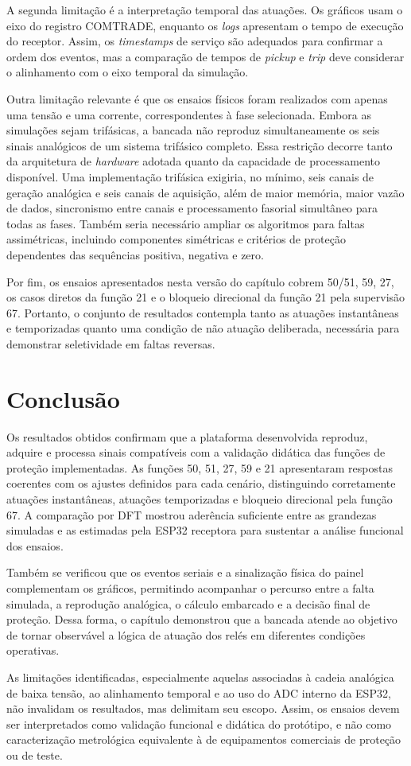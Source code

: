 A segunda limitação é a interpretação temporal das atuações. Os gráficos usam o eixo do registro COMTRADE, enquanto os \textit{logs} apresentam o tempo de execução do receptor. Assim, os \textit{timestamps} de serviço são adequados para confirmar a ordem dos eventos, mas a comparação de tempos de \textit{pickup} e \textit{trip} deve considerar o alinhamento com o eixo temporal da simulação.

Outra limitação relevante é que os ensaios físicos foram realizados com apenas uma tensão e uma corrente, correspondentes à fase selecionada. Embora as simulações sejam trifásicas, a bancada não reproduz simultaneamente os seis sinais analógicos de um sistema trifásico completo. Essa restrição decorre tanto da arquitetura de \textit{hardware} adotada quanto da capacidade de processamento disponível. Uma implementação trifásica exigiria, no mínimo, seis canais de geração analógica e seis canais de aquisição, além de maior memória, maior vazão de dados, sincronismo entre canais e processamento fasorial simultâneo para todas as fases. Também seria necessário ampliar os algoritmos para faltas assimétricas, incluindo componentes simétricas e critérios de proteção dependentes das sequências positiva, negativa e zero.

Por fim, os ensaios apresentados nesta versão do capítulo cobrem 50/51, 59, 27, os casos diretos da função 21 e o bloqueio direcional da função 21 pela supervisão 67. Portanto, o conjunto de resultados contempla tanto as atuações instantâneas e temporizadas quanto uma condição de não atuação deliberada, necessária para demonstrar seletividade em faltas reversas.

\section{Conclusão}

Os resultados obtidos confirmam que a plataforma desenvolvida reproduz, adquire e processa sinais compatíveis com a validação didática das funções de proteção implementadas. As funções 50, 51, 27, 59 e 21 apresentaram respostas coerentes com os ajustes definidos para cada cenário, distinguindo corretamente atuações instantâneas, atuações temporizadas e bloqueio direcional pela função 67. A comparação por DFT mostrou aderência suficiente entre as grandezas simuladas e as estimadas pela ESP32 receptora para sustentar a análise funcional dos ensaios.

Também se verificou que os eventos seriais e a sinalização física do painel complementam os gráficos, permitindo acompanhar o percurso entre a falta simulada, a reprodução analógica, o cálculo embarcado e a decisão final de proteção. Dessa forma, o capítulo demonstrou que a bancada atende ao objetivo de tornar observável a lógica de atuação dos relés em diferentes condições operativas.

As limitações identificadas, especialmente aquelas associadas à cadeia analógica de baixa tensão, ao alinhamento temporal e ao uso do ADC interno da ESP32, não invalidam os resultados, mas delimitam seu escopo. Assim, os ensaios devem ser interpretados como validação funcional e didática do protótipo, e não como caracterização metrológica equivalente à de equipamentos comerciais de proteção ou de teste.
